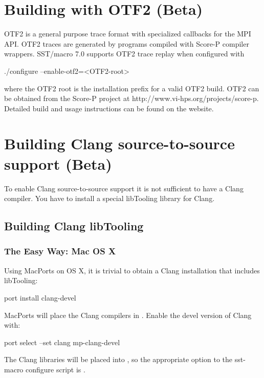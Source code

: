 \section{Building with OTF2 (Beta)}
\label{sec:buildingOtf2}
OTF2 is a general purpose trace format with specialized callbacks for the MPI API. OTF2 traces are generated by programs compiled with Score-P compiler wrappers. SST/macro 7.0 supports OTF2 trace replay when configured with 

\begin{ViFile}
./configure --enable-otf2=<OTF2-root>	
\end{ViFile}
where the OTF2 root is the installation prefix for a valid OTF2 build. OTF2 can be obtained from the Score-P project at {http://www.vi-hps.org/projects/score-p}.
Detailed build and usage instructions can be found on the website.


\section{Building Clang source-to-source support (Beta)}
\label{sec:buildingClang}

To enable Clang source-to-source support it is not sufficient to have a Clang compiler.  You have to install a special libTooling library for Clang.

\subsection{Building Clang libTooling}
\label{subsec:buildingClanglibTooling}

\subsubsection{The Easy Way: Mac OS X}
\label{subsubsec:libToolingOSX}
Using MacPorts on OS X, it is trivial to obtain a Clang installation that includes libTooling:

\begin{ViFile}
port install clang-devel
\end{ViFile}

MacPorts will place the Clang compilers in .  Enable the devel version of Clang with:

\begin{ViFile}
port select --set clang mp-clang-devel
\end{ViFile}

The Clang libraries will be placed into , so the appropriate option to the sst-macro configure script is .

